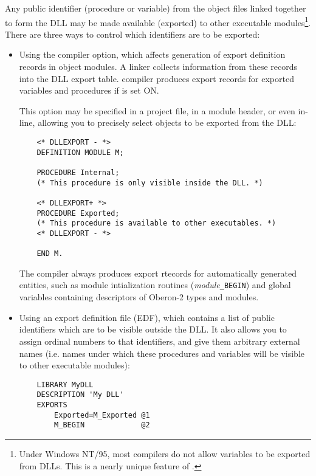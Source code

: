 Any public identifier (procedure or variable) from the object files
linked together to form the DLL may be made available
(exported) to other executable modules\footnote{Under Windows NT/95,
most compilers do not allow variables to be exported from DLLs. This
is a nearly unique feature of \XDS{}.}.
There are three ways to control which identifiers are to be exported:
\begin{itemize}
\item Using the  compiler option, which affects generation
      of export definition records in object modules. A linker collects
      information from these records into the DLL export table.
      \XDS{} compiler produces export records for exported variables and
      procedures if  is set ON.

      This option may be specified in a project file, in a module header,
      or even in-line, allowing you to precisely select objects to be exported
      from the DLL:

\begin{verbatim}
    <* DLLEXPORT - *>
    DEFINITION MODULE M;

    PROCEDURE Internal;
    (* This procedure is only visible inside the DLL. *)

    <* DLLEXPORT+ *>
    PROCEDURE Exported;
    (* This procedure is available to other executables. *)
    <* DLLEXPORT - *>

    END M.
\end{verbatim}

      The compiler always produces export rtecords for automatically
      generated entities, such as module intialization routines
      ({\it module}\verb'_BEGIN') and global variables containing
      descriptors of Oberon-2 types and modules.

\item Using an export definition file (EDF), which contains
      a list of public identifiers which are to be visible
      outside the DLL. It also allows you to assign ordinal numbers to
      that identifiers, and give them arbitrary external names
      (i.e. names under which these procedures
      and variables will be visible to other executable modules):

\begin{verbatim}
    LIBRARY MyDLL
    DESCRIPTION 'My DLL'
    EXPORTS
        Exported=M_Exported @1
        M_BEGIN             @2
\end{verbatim}


\end{itemize}
